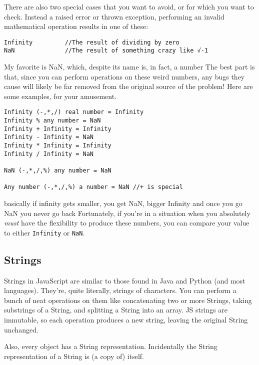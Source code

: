 \documentclass[12pt]{article}
\newcommand{\todo}[1]{\marginpar{\color{red} #1}}
\newcommand{\say}[1]{{\color{magenta} #1}}
\begin{document}
There are also two special cases that you want to avoid, or for which you want to check. Instead a raised error or thrown exception, performing an invalid mathematical operation results in one of these:
\begin{Verbatim}[frame=single]
Infinity         //The result of dividing by zero
NaN              //The result of something crazy like √-1
\end{Verbatim}
 \say{My favorite is NaN, which, despite its name is, in fact, a number}
 The best part is that, since you can perform operations on these weird numbers, any bugs they cause will likely be far removed from the original source of the problem! Here are some examples, for your amusement.
\begin{Verbatim}[frame=single]
Infinity (-,*,/) real number = Infinity
Infinity % any number = NaN
Infinity + Infinity = Infinity
Infinity - Infinity = NaN
Infinity * Infinity = Infinity
Infinity / Infinity = NaN    

NaN (-,*,/,%) any number = NaN

Any number (-,*,/,%) a number = NaN //+ is special
\end{Verbatim}
\say{basically if infinity gets smaller, you get NaN, bigger Infinity and once you go NaN you never go back}
Fortunately, if you're in a situation when you absolutely \emph{must} have the flexibility to produce these numbers, you can compare your value to either \texttt{Infinity} or \texttt{NaN}.

\subsection{Strings}
Strings in JavaScript are similar to those found in Java and Python (and most languages). They're, quite literally, strings of characters. You can perform a bunch of neat operations on them like concatenating two or more Strings, taking substrings of a String, and splitting a String into an array. JS strings are immutable, so each operation produces a new string, leaving the original String unchanged.
\par \todo{make flow better}
Also, every object has a String representation. Incidentally the String representation of a String is (a copy of) itself.
\end{document}
